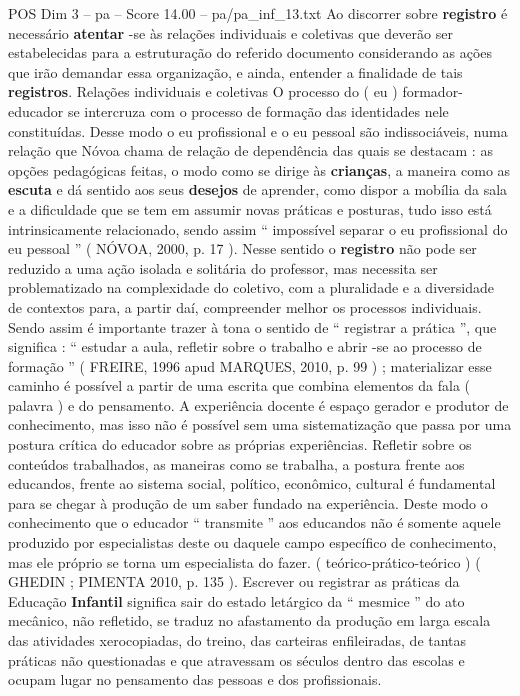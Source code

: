 \begin{textsample}{POS Dim 3 – pa – Score 14.00 – pa/pa\_inf\_13.txt}
Ao discorrer sobre \textbf{registro} é necessário \textbf{atentar} -se às relações individuais e coletivas que deverão ser estabelecidas para a estruturação do referido documento considerando as ações que irão demandar essa organização, e ainda, entender a finalidade de tais \textbf{registros}.
Relações individuais e coletivas O processo do ( eu ) formador-educador se intercruza com o processo de formação das identidades nele constituídas.
Desse modo o eu profissional e o eu pessoal são indissociáveis, numa relação que Nóvoa chama de relação de dependência das quais se destacam : as opções pedagógicas feitas, o modo como se dirige às \textbf{crianças}, a maneira como as \textbf{escuta} e dá sentido aos seus \textbf{desejos} de aprender, como dispor a mobília da sala e a dificuldade que se tem em assumir novas práticas e posturas, tudo isso está intrinsicamente relacionado, sendo assim “ impossível separar o eu profissional do eu pessoal ” ( NÓVOA, 2000, p. 17 ).
Nesse sentido o \textbf{registro} não pode ser reduzido a uma ação isolada e solitária do professor, mas necessita ser problematizado na complexidade do coletivo, com a pluralidade e a diversidade de contextos para, a partir daí, compreender melhor os processos individuais.
Sendo assim é importante trazer à tona o sentido de “ registrar a prática ”, que significa : “ estudar a aula, refletir sobre o trabalho e abrir -se ao processo de formação ” ( FREIRE, 1996 apud MARQUES, 2010, p. 99 ) ; materializar esse caminho é possível a partir de uma escrita que combina elementos da fala ( palavra ) e do pensamento.
A experiência docente é espaço gerador e produtor de conhecimento, mas isso não é possível sem uma sistematização que passa por uma postura crítica do educador sobre as próprias experiências.
Refletir sobre os conteúdos trabalhados, as maneiras como se trabalha, a postura frente aos educandos, frente ao sistema social, político, econômico, cultural é fundamental para se chegar à produção de um saber fundado na experiência.
Deste modo o conhecimento que o educador “ transmite ” aos educandos não é somente aquele produzido por especialistas deste ou daquele campo específico de conhecimento, mas ele próprio se torna um especialista do fazer. ( teórico-prático-teórico ) ( GHEDIN ; PIMENTA 2010, p. 135 ).
Escrever ou registrar as práticas da Educação \textbf{Infantil} significa sair do estado letárgico da “ mesmice ” do ato mecânico, não refletido, se traduz no afastamento da produção em larga escala das atividades xerocopiadas, do treino, das carteiras enfileiradas, de tantas práticas não questionadas e que atravessam os séculos dentro das escolas e ocupam lugar no pensamento das pessoas e dos profissionais.

\end{textsample}
